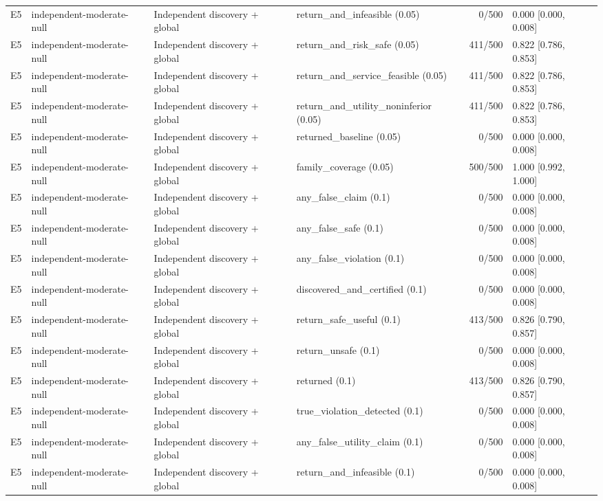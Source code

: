 \begin{longtable}{p{.04\linewidth}p{.18\linewidth}p{.19\linewidth}p{.16\linewidth}r p{.21\linewidth}}
E5 & independent-moderate-null & Independent discovery + global & return\_and\_infeasible (0.05) & 0/500 & 0.000 [0.000, 0.008]\\
E5 & independent-moderate-null & Independent discovery + global & return\_and\_risk\_safe (0.05) & 411/500 & 0.822 [0.786, 0.853]\\
E5 & independent-moderate-null & Independent discovery + global & return\_and\_service\_feasible (0.05) & 411/500 & 0.822 [0.786, 0.853]\\
E5 & independent-moderate-null & Independent discovery + global & return\_and\_utility\_noninferior (0.05) & 411/500 & 0.822 [0.786, 0.853]\\
E5 & independent-moderate-null & Independent discovery + global & returned\_baseline (0.05) & 0/500 & 0.000 [0.000, 0.008]\\
E5 & independent-moderate-null & Independent discovery + global & family\_coverage (0.05) & 500/500 & 1.000 [0.992, 1.000]\\
E5 & independent-moderate-null & Independent discovery + global & any\_false\_claim (0.1) & 0/500 & 0.000 [0.000, 0.008]\\
E5 & independent-moderate-null & Independent discovery + global & any\_false\_safe (0.1) & 0/500 & 0.000 [0.000, 0.008]\\
E5 & independent-moderate-null & Independent discovery + global & any\_false\_violation (0.1) & 0/500 & 0.000 [0.000, 0.008]\\
E5 & independent-moderate-null & Independent discovery + global & discovered\_and\_certified (0.1) & 0/500 & 0.000 [0.000, 0.008]\\
E5 & independent-moderate-null & Independent discovery + global & return\_safe\_useful (0.1) & 413/500 & 0.826 [0.790, 0.857]\\
E5 & independent-moderate-null & Independent discovery + global & return\_unsafe (0.1) & 0/500 & 0.000 [0.000, 0.008]\\
E5 & independent-moderate-null & Independent discovery + global & returned (0.1) & 413/500 & 0.826 [0.790, 0.857]\\
E5 & independent-moderate-null & Independent discovery + global & true\_violation\_detected (0.1) & 0/500 & 0.000 [0.000, 0.008]\\
E5 & independent-moderate-null & Independent discovery + global & any\_false\_utility\_claim (0.1) & 0/500 & 0.000 [0.000, 0.008]\\
E5 & independent-moderate-null & Independent discovery + global & return\_and\_infeasible (0.1) & 0/500 & 0.000 [0.000, 0.008]\\

\end{longtable}
